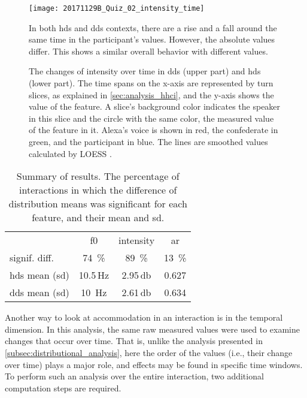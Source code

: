 \begin{figure}[t]
	\centering
	{\texttt{[image: 20171129B\_Quiz\_02\_intensity\_time]}
	\label{fig:hds_dds_time_intensity}}
	\caption[Comparison of temporal intensity trends of \acs{hds} and \acs{dds}]
		{The changes of intensity over time in \ac{dds} (upper part) and \ac{hds} (lower part).
		The time spans on the x-axis are represented by turn slices, as explained in \cref{sec:analysis_hhci}, and the y-axis shows the value of the feature.
		A slice's background color indicates the speaker in this slice and the circle with the same color, the measured value of the feature in it.
		Alexa's voice is shown in red, the confederate in green, and the participant in blue.
		The lines are smoothed values calculated by LOESS \citep{Cleveland1988locally}.}
		In both \ac{hds} and \ac{dds} contexts, there are a rise and a fall around the same time in the participant's values.
		However, the absolute values differ.
		This shows a similar overall behavior with different values.
	\label{fig:hds_dds_time_comparisons}
\end{figure}
%
\begin{table}[t]
	\centering
	\caption[Percentage of significantly different interaction pairs in crowd component]
		{Summary of results. The percentage of interactions in which the difference of distribution means was significant for each feature, and their mean and \acf{sd}.}
	\label{tab:results_hhci_addressee}
	\begin{tabularx}{\linewidth}{XSSS}
		\toprule
		& \acs{f0} 						& {intensity}				& \acs{ar}									\\
		signif. diff.					& \SI{74}{\percent}			& \SI{89}{\percent}		& \SI{13}{\percent} \\
		\acs{hds} mean (\acs{sd}) 		& 10.5\,\si{\hertz}			& 2.95\,\si{\decibel}	& 0.627				\\
		\acs{dds} mean (\acs{sd}) 		& 10 \,\si{\hertz}		& 2.61\,\si{\decibel}	& 0.634				\\
		\bottomrule	
	\end{tabularx}
\end{table}
%	
Another way to look at accommodation in an interaction is in the temporal dimension.
In this analysis, the same raw measured values were used to examine changes that occur over time.
That is, unlike the analysis presented in \cref{subsec:distributional_analysis}, here the order of the values (i.e., their change over time) plays a major role, and effects may be found in specific time windows.
To perform such an analysis over the entire interaction, two additional computation steps are required.

